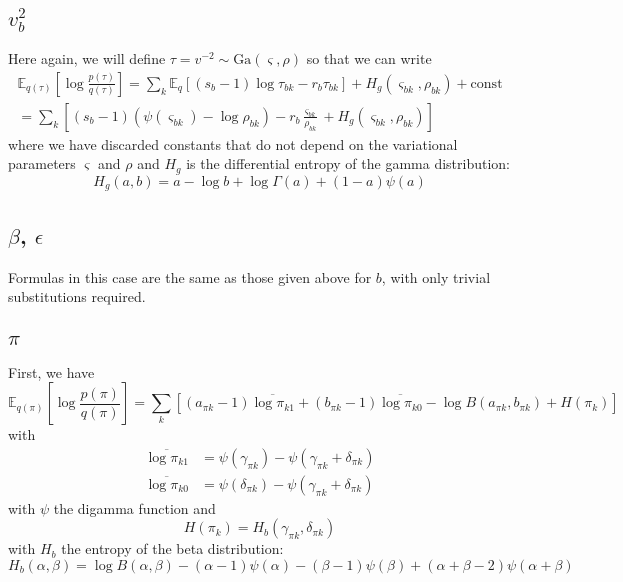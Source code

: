 \documentclass[11pt]{article}
\begin{document}
\subsection{$v^2_b$}
Here again, we will define $\tau = v^{-2} \sim \mathrm{Ga}(\varsigma, \rho)$ so that we can write
\begin{multline}
    \mathbb{E}_{q(\tau)}\left[\log \frac{p(\tau)}{q(\tau)}\right] =
    \sum_k \mathbb{E}_q \left[
    (s_{b} - 1) \log \tau_{bk} - r_{b} \tau_{bk} \right]  
    + H_g(\varsigma_{bk}, \rho_{bk})    
    + \mathrm{const} \\
    = \sum_k \left[ 
    (s_{b} - 1) (\psi(\varsigma_{bk}) - \log \rho_{bk}) 
    - r_{b} \frac{\varsigma_{bk}}{\rho_{bk}} + H_g(\varsigma_{bk}, \rho_{bk})
    \right]
\end{multline}
where we have discarded constants that do not depend on the variational parameters $\varsigma$ and $\rho$ and $H_g$ is the differential entropy of the gamma distribution:
\begin{equation}
    H_g(a, b) = a - \log b + \log \Gamma(a) + (1 - a)\psi(a)
\end{equation}

\subsection{$\beta$, $\epsilon$}
Formulas in this case are the same as those given above for $b$, with only trivial substitutions required.

\subsection{$\pi$}
First, we have
\begin{equation}
    \mathbb{E}_{q(\pi)} \left[\log \frac{p(\pi)}{q(\pi)} \right] = \sum_k \left[(a_{\pi k} - 1)\overline{\log \pi_{k1}} + (b_{\pi k} - 1) \overline{\log \pi_{k0}} - \log B(a_{\pi k}, b_{\pi k}) + H(\pi_k) \right]
\end{equation}
with
\begin{align}
    \overline{\log \pi_{k1}} &= \psi(\gamma_{\pi k}) - \psi(\gamma_{\pi k} + \delta_{\pi k}) \\
    \overline{\log \pi_{k0}} &= \psi(\delta_{\pi k}) - \psi(\gamma_{\pi k} + \delta_{\pi k})
\end{align}
with $\psi$ the digamma function and 
\begin{equation}
    H(\pi_k) = H_b(\gamma_{\pi k}, \delta_{\pi k})
\end{equation}
with $H_b$ the entropy of the beta distribution:
\begin{equation}
    H_b(\alpha, \beta) = \log B(\alpha, \beta) - (\alpha - 1) \psi(\alpha) - (\beta - 1) \psi(\beta) + (\alpha + \beta - 2)\psi(\alpha + \beta)
\end{equation}
\end{document}
